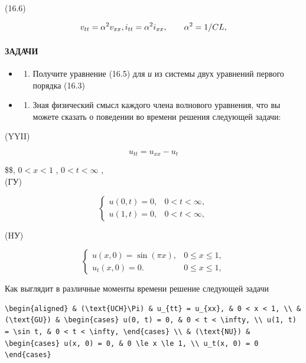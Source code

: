 \documentclass[
  ukrainian,
]{article}
\providecommand{\tightlist}{%
  \setlength{\itemsep}{0pt}\setlength{\parskip}{0pt}}
\begin{document}
(16.6)

\[
v_{tt} = \alpha^2 v_{xx}, \\ i_{tt} = \alpha^2 i_{xx}, \qquad \alpha^2 = 1/CL,
\]

\paragraph{ЗАДАЧИ}\label{ux437ux430ux434ux430ux447ux438-1}

\begin{itemize}
\tightlist
\item
  \begin{enumerate}
  \def\labelenumi{\arabic{enumi}.}
  \tightlist
  \item
    Получите уравнение (16.5) для \emph{и} из системы двух уравнений
    первого порядка (16.3)
  \end{enumerate}
\item
  \begin{enumerate}
  \def\labelenumi{\arabic{enumi}.}
  \setcounter{enumi}{1}
  \tightlist
  \item
    Зная физический смысл каждого члена волнового уравнения, что вы
    можете сказать о поведении во времени решения следующей задачи:
  \end{enumerate}
\end{itemize}

(YYII)

\[
u_{tt} = u_{xx} - u_t
\]

\$\$, \(0 < x < 1\) , \(0 < t < \infty\) ,\\
(ГУ)

\[
\begin{cases} u(0, t) = 0, & 0 < t < \infty, \\ u(1, t) = 0, & 0 < t < \infty, \end{cases}
\]

(HУ)

\[
\begin{cases} u(x, 0) = \sin(\pi x), & 0 \le x \le 1, \\ u_t(x, 0) = 0. & 0 \le x \le 1, \end{cases}
\]

Как выглядит в различные моменты времени решение следующей задачи

\begin{verbatim}
\begin{aligned} & (\text{UCH}\Pi) & u_{tt} = u_{xx}, & 0 < x < 1, \\ & (\text{GU}) & \begin{cases} u(0, t) = 0, & 0 < t < \infty, \\ u(1, t) = \sin t, & 0 < t < \infty, \end{cases} \\ & (\text{NU}) & \begin{cases} u(x, 0) = 0, & 0 \le x \le 1, \\ u_t(x, 0) = 0 \end{cases}
\end{verbatim}
\end{document}

